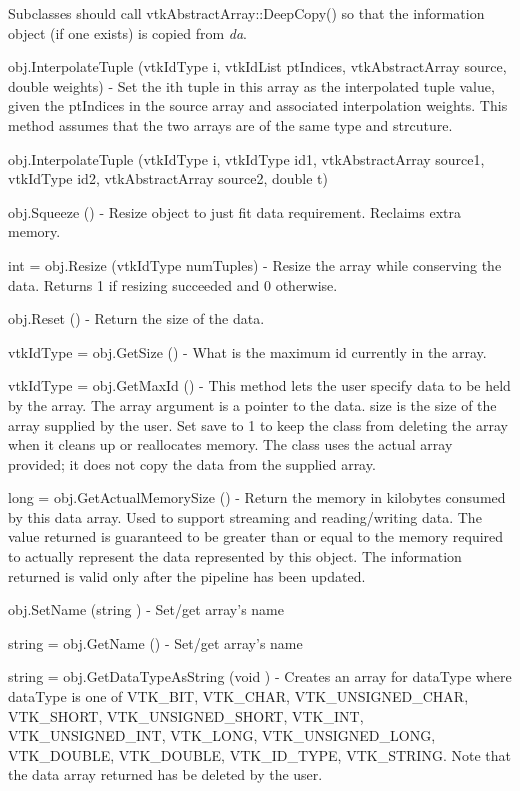 \begin{DoxyItemize}
Subclasses should call vtk\-Abstract\-Array\-::\-Deep\-Copy() so that the information object (if one exists) is copied from {\itshape da}.  
\item {\ttfamily obj.\-Interpolate\-Tuple (vtk\-Id\-Type i, vtk\-Id\-List pt\-Indices, vtk\-Abstract\-Array source, double weights)} -\/ Set the ith tuple in this array as the interpolated tuple value, given the pt\-Indices in the source array and associated interpolation weights. This method assumes that the two arrays are of the same type and strcuture.  
\item {\ttfamily obj.\-Interpolate\-Tuple (vtk\-Id\-Type i, vtk\-Id\-Type id1, vtk\-Abstract\-Array source1, vtk\-Id\-Type id2, vtk\-Abstract\-Array source2, double t)}  
\item {\ttfamily obj.\-Squeeze ()} -\/ Resize object to just fit data requirement. Reclaims extra memory.  
\item {\ttfamily int = obj.\-Resize (vtk\-Id\-Type num\-Tuples)} -\/ Resize the array while conserving the data. Returns 1 if resizing succeeded and 0 otherwise.  
\item {\ttfamily obj.\-Reset ()} -\/ Return the size of the data.  
\item {\ttfamily vtk\-Id\-Type = obj.\-Get\-Size ()} -\/ What is the maximum id currently in the array.  
\item {\ttfamily vtk\-Id\-Type = obj.\-Get\-Max\-Id ()} -\/ This method lets the user specify data to be held by the array. The array argument is a pointer to the data. size is the size of the array supplied by the user. Set save to 1 to keep the class from deleting the array when it cleans up or reallocates memory. The class uses the actual array provided; it does not copy the data from the supplied array.  
\item {\ttfamily long = obj.\-Get\-Actual\-Memory\-Size ()} -\/ Return the memory in kilobytes consumed by this data array. Used to support streaming and reading/writing data. The value returned is guaranteed to be greater than or equal to the memory required to actually represent the data represented by this object. The information returned is valid only after the pipeline has been updated.  
\item {\ttfamily obj.\-Set\-Name (string )} -\/ Set/get array's name  
\item {\ttfamily string = obj.\-Get\-Name ()} -\/ Set/get array's name  
\item {\ttfamily string = obj.\-Get\-Data\-Type\-As\-String (void )} -\/ Creates an array for data\-Type where data\-Type is one of V\-T\-K\-\_\-\-B\-I\-T, V\-T\-K\-\_\-\-C\-H\-A\-R, V\-T\-K\-\_\-\-U\-N\-S\-I\-G\-N\-E\-D\-\_\-\-C\-H\-A\-R, V\-T\-K\-\_\-\-S\-H\-O\-R\-T, V\-T\-K\-\_\-\-U\-N\-S\-I\-G\-N\-E\-D\-\_\-\-S\-H\-O\-R\-T, V\-T\-K\-\_\-\-I\-N\-T, V\-T\-K\-\_\-\-U\-N\-S\-I\-G\-N\-E\-D\-\_\-\-I\-N\-T, V\-T\-K\-\_\-\-L\-O\-N\-G, V\-T\-K\-\_\-\-U\-N\-S\-I\-G\-N\-E\-D\-\_\-\-L\-O\-N\-G, V\-T\-K\-\_\-\-D\-O\-U\-B\-L\-E, V\-T\-K\-\_\-\-D\-O\-U\-B\-L\-E, V\-T\-K\-\_\-\-I\-D\-\_\-\-T\-Y\-P\-E, V\-T\-K\-\_\-\-S\-T\-R\-I\-N\-G. Note that the data array returned has be deleted by the user.  

\end{DoxyItemize}
